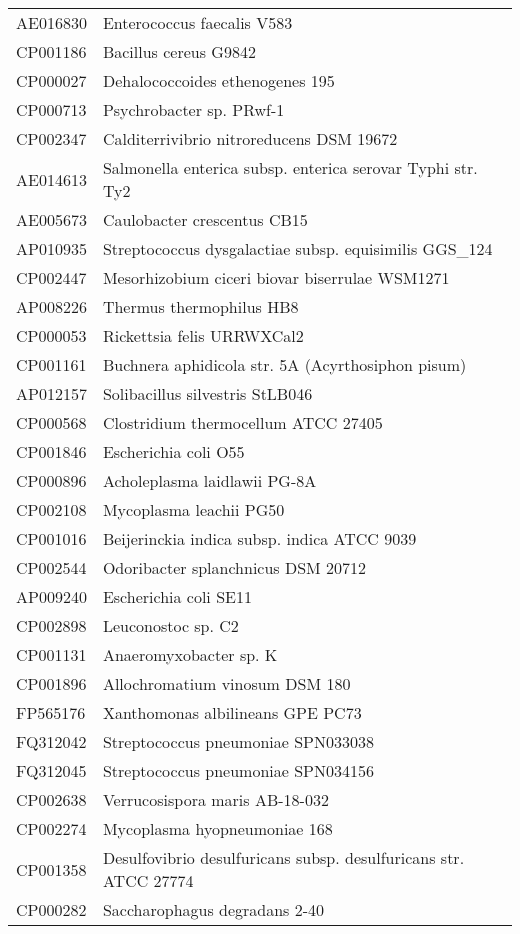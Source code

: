 \begin{longtable}{ll}
AE016830 & Enterococcus faecalis V583\\
CP001186 & Bacillus cereus G9842\\
CP000027 & Dehalococcoides ethenogenes 195\\
CP000713 & Psychrobacter sp. PRwf-1\\
CP002347 & Calditerrivibrio nitroreducens DSM 19672\\
AE014613 & Salmonella enterica subsp. enterica serovar Typhi str. Ty2\\
AE005673 & Caulobacter crescentus CB15\\
AP010935 & Streptococcus dysgalactiae subsp. equisimilis GGS_124\\
CP002447 & Mesorhizobium ciceri biovar biserrulae WSM1271\\
AP008226 & Thermus thermophilus HB8\\
CP000053 & Rickettsia felis URRWXCal2\\
CP001161 & Buchnera aphidicola str. 5A (Acyrthosiphon pisum)\\
AP012157 & Solibacillus silvestris StLB046\\
CP000568 & Clostridium thermocellum ATCC 27405\\
CP001846 & Escherichia coli O55\\
CP000896 & Acholeplasma laidlawii PG-8A\\
CP002108 & Mycoplasma leachii PG50\\
CP001016 & Beijerinckia indica subsp. indica ATCC 9039\\
CP002544 & Odoribacter splanchnicus DSM 20712\\
AP009240 & Escherichia coli SE11\\
CP002898 & Leuconostoc sp. C2\\
CP001131 & Anaeromyxobacter sp. K\\
CP001896 & Allochromatium vinosum DSM 180\\
FP565176 & Xanthomonas albilineans GPE PC73\\
FQ312042 & Streptococcus pneumoniae SPN033038\\
FQ312045 & Streptococcus pneumoniae SPN034156\\
CP002638 & Verrucosispora maris AB-18-032\\
CP002274 & Mycoplasma hyopneumoniae 168\\
CP001358 & Desulfovibrio desulfuricans subsp. desulfuricans str. ATCC 27774\\
CP000282 & Saccharophagus degradans 2-40\\

\end{longtable}
